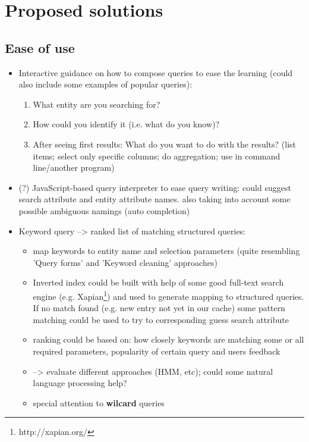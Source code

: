 \section{Proposed solutions}
\subsection{Ease of use}

\begin{itemize}
\item Interactive guidance on how to compose queries to ease the learning (could also include some examples of popular queries):
\begin{enumerate}
\item What entity are you searching for?
\item How could you identify it (i.e. what do you know)?
\item After seeing first results: What do you want to do with the results? (list items; select only specific columns; do aggregation; use in command line/another program)
\end{enumerate}

\item (?) JavaScript-based query interpreter to ease query writing: could suggest search attribute and entity attribute names. also taking into account some possible ambiguous namings (auto completion)


\item Keyword query --> ranked list of matching structured queries:
	\begin{itemize}
	\item map keywords to entity name and selection parameters (quite resembling 'Query forms' and 'Keyword cleaning' approaches)
	\item
		{\color{red} Inverted index could be built with help of some good full-text search engine (e.g. Xapian\footnote{http://xapian.org/}) and used to generate mapping to structured queries. If no match found (e.g. new entry not yet in our cache) some pattern matching could be used to try to corresponding guess search attribute}
	\item ranking could be based on: how closely keywords are matching some or all required parameters, popularity of certain query and users feedback
	
	\item {\color{red}	--> evaluate different approaches (HMM, etc); could some natural language processing help?}
	\item special attention to \textbf{wilcard} queries
	
	\end{itemize}
\end{itemize}


